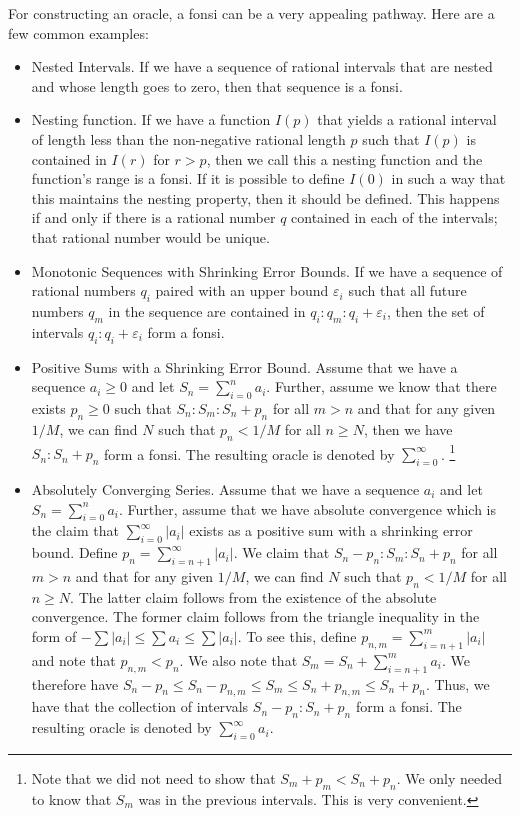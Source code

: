 \documentclass[12pt]{article}
\theoremstyle{remark}
\begin{document}
For constructing an oracle, a fonsi can be a very appealing pathway. Here are a few common examples: 

\begin{itemize}
    \item Nested Intervals. If we have a sequence of rational intervals that are nested and whose length goes to zero, then that sequence is a fonsi.
    \item Nesting function. If we have a function $I(p)$ that yields a rational interval of length less than the non-negative rational length $p$ such that $I(p)$ is contained in $I(r)$ for $r>p$, then we call this a nesting function and the function's range is a fonsi. If it is possible to define $I(0)$ in such a way that this maintains the nesting property, then it should be defined. This happens if and only if there is a rational number $q$ contained in each of the intervals; that rational number would be unique. 
    \item Monotonic Sequences with Shrinking Error Bounds. If we have a sequence of rational numbers $q_i$ paired with an upper bound $\varepsilon_i$ such that all future numbers $q_m$ in the sequence are contained in $q_i:q_m:q_i+\varepsilon_i$, then the set of intervals $q_i:q_i+\varepsilon_i$ form a fonsi. 
    \item Positive Sums with a Shrinking Error Bound. Assume that we have a sequence $a_i\geq 0$ and let $S_n = \sum_{i=0}^n a_i$. Further, assume we know that there exists $p_n \geq 0$ such that $S_n: S_m : S_n + p_n$ for all $m > n$ and that for any given $1/M$, we can find $N$ such that $p_n < 1/M$ for all $n \geq N$, then we have $S_n: S_n + p_n$ form a fonsi. The resulting oracle is denoted by $\sum_{i=0}^\infty$. \footnote{Note that we did not need to show that $S_m+p_m < S_n + p_n$. We only needed to know that $S_m$ was in the previous intervals. This is very convenient.}
    \item Absolutely Converging Series. Assume that we have a sequence $a_i$ and let $S_n = \sum_{i=0}^n a_i$. Further, assume that we have absolute convergence which is the claim that $\sum_{i=0}^\infty |a_i|$ exists as a positive sum  with a shrinking error bound. Define $p_n = \sum_{i=n+1}^\infty |a_i|$. We claim that $S_n-p_n: S_m : S_n + p_n$ for all $m > n$ and that for any given $1/M$, we can find $N$ such that $p_n < 1/M$ for all $n \geq N$. The latter claim follows from the existence of the absolute convergence. The former claim follows from the triangle inequality in the form of $- \sum |a_i| \leq \sum a_i \leq \sum |a_i| $. To see this, define $p_{n,m} = \sum_{i=n+1}^m |a_i|$ and note that $p_{n,m} < p_n$. We also note that $S_m = S_n + \sum_{i=n+1}^m a_i$.  We therefore have  $S_n - p_n \leq S_n - p_{n,m} \leq S_m \leq S_n+ p_{n,m} \leq S_n + p_n$. Thus, we have that the collection of intervals $S_n-p_n: S_n + p_n$ form a fonsi. The resulting oracle is denoted by $\sum_{i=0}^\infty a_i$.
\end{itemize}
\end{document}

